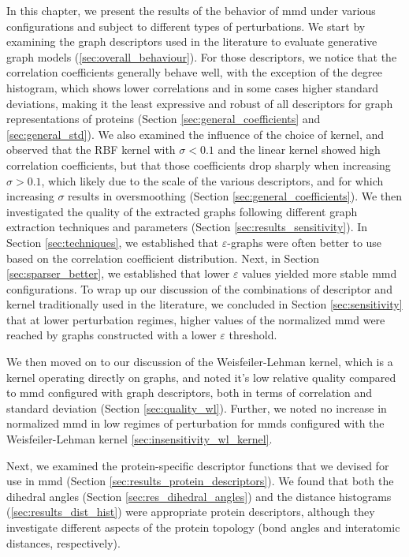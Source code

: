 In this chapter, we present the results of the behavior of \gls{mmd} under
various configurations and subject to different types of perturbations. We start
by examining the graph descriptors used in the literature to evaluate generative
graph models (\ref{sec:overall_behaviour}). For those descriptors, we notice
that the correlation coefficients generally behave well, with the exception of
the degree histogram, which shows lower correlations and in some cases higher
standard deviations, making it the least expressive and robust of all
descriptors for graph representations of proteins (Section
\ref{sec:general_coefficients} and \ref{sec:general_std}). We also examined the
influence of the choice of kernel, and observed that the RBF kernel with
$\sigma<0.1$ and the linear kernel showed high correlation coefficients, but
that those coefficients drop sharply when increasing $\sigma>0.1$, which likely
due to the scale of the various descriptors, and for which increasing $\sigma$
results in oversmoothing (Section \ref{sec:general_coefficients}). We then
investigated the quality of the extracted graphs following different graph
extraction techniques and parameters (Section \ref{sec:results_sensitivity}). In
Section \ref{sec:techniques}, we established that $\varepsilon$-graphs were
often better to use based on the correlation coefficient distribution. Next, in
Section \ref{sec:sparser_better}, we established that lower $\varepsilon$ values
yielded more stable \gls{mmd} configurations. To wrap up our
discussion of the combinations of descriptor and kernel traditionally used in
the literature, we concluded in Section \ref{sec:sensitivity} that at lower
perturbation regimes, higher values of the normalized \gls{mmd} were reached by graphs
constructed with a lower $\varepsilon$ threshold.

We then moved on to our discussion of the Weisfeiler-Lehman kernel, which is a
kernel operating directly on graphs, and noted it's low relative quality
compared to \gls{mmd} configured with graph descriptors, both in terms of correlation
and standard deviation (Section \ref{sec:quality_wl}). Further, we noted no
increase in normalized \gls{mmd} in low regimes of perturbation for \gls{mmd}s configured
with the Weisfeiler-Lehman kernel \ref{sec:insensitivity_wl_kernel}.

Next, we examined the protein-specific descriptor functions that we devised for
use in \gls{mmd} (Section \ref{sec:results_protein_descriptors}). We found that both
the dihedral angles (Section \ref{sec:res_dihedral_angles}) and the distance
histograms (\ref{sec:results_dist_hist}) were appropriate protein descriptors,
although they investigate different aspects of the protein topology (bond angles
and interatomic distances, respectively).

